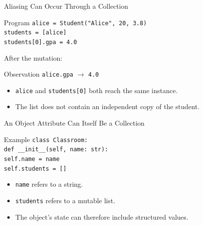 \documentclass[aspectratio=169,10pt]{beamer}
\begin{document}
\begin{frame}{Aliasing Can Occur Through a Collection}
  \begin{block}{Program}
    \texttt{alice = Student("Alice", 20, 3.8)}\\
    \texttt{students = [alice]}\\
    \texttt{students[0].gpa = 4.0}
  \end{block}

  After the mutation:
  \begin{block}{Observation}
    \texttt{alice.gpa} $\rightarrow$ \texttt{4.0}
  \end{block}

  \begin{itemize}
    \item \texttt{alice} and \texttt{students[0]} both reach the same instance.
    \item The list does not contain an independent copy of the student.
  \end{itemize}
\end{frame}


\begin{frame}{An Object Attribute Can Itself Be a Collection}
  \begin{block}{Example}
    \texttt{class Classroom:}\\
    \hspace*{0.20in}\texttt{def \_\_init\_\_(self, name: str):}\\
    \hspace*{0.40in}\texttt{self.name = name}\\
    \hspace*{0.40in}\texttt{self.students = []}
  \end{block}

  \begin{itemize}
    \item \texttt{name} refers to a string.
    \item \texttt{students} refers to a mutable list.
    \item The object's state can therefore include structured values.
  \end{itemize}
\end{frame}
\end{document}
